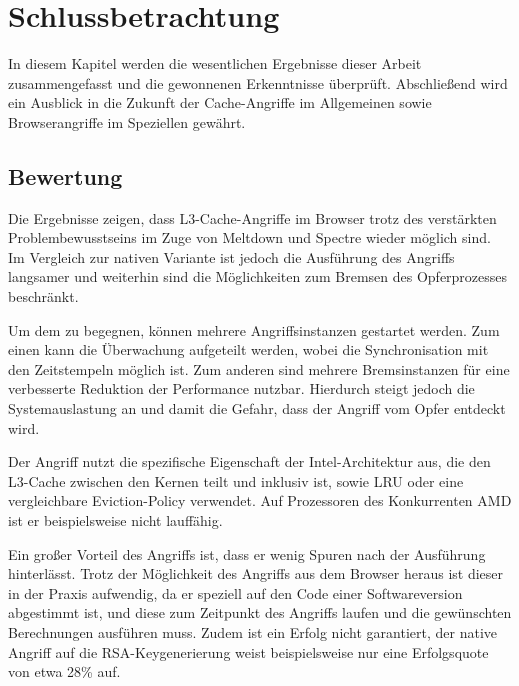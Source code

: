 \chapter{Schlussbetrachtung}
\label{chapter:conclusions}

In diesem Kapitel werden die wesentlichen Ergebnisse dieser Arbeit zusammengefasst und die gewonnenen Erkenntnisse %
überprüft.
Abschließend wird ein Ausblick in die Zukunft der Cache-Angriffe im Allgemeinen sowie Browserangriffe im Speziellen gewährt.

\section{Bewertung}

Die Ergebnisse zeigen, dass L3-Cache-Angriffe im Browser trotz des verstärkten Problembewusstseins im Zuge von Meltdown und Spectre wieder möglich sind.
Im Vergleich zur nativen Variante ist jedoch die Ausführung des Angriffs langsamer und weiterhin sind die Möglichkeiten zum Bremsen des Opferprozesses beschränkt.

Um dem zu begegnen, können mehrere Angriffsinstanzen gestartet werden.
Zum einen kann die Überwachung aufgeteilt werden, wobei die Synchronisation mit den Zeitstempeln möglich ist.
Zum anderen sind mehrere Bremsinstanzen für eine verbesserte Reduktion der Performance nutzbar.
Hierdurch steigt jedoch die Systemauslastung an und damit die Gefahr, dass der Angriff vom Opfer entdeckt wird. 


Der Angriff nutzt die spezifische Eigenschaft der Intel-Architektur aus, die den L3-Cache zwischen den Kernen teilt und inklusiv ist, sowie LRU oder eine vergleichbare Eviction-Policy verwendet.
Auf Prozessoren des Konkurrenten AMD ist er beispielsweise nicht lauffähig.

Ein großer Vorteil des Angriffs ist, dass er wenig Spuren nach der Ausführung hinterlässt.
Trotz der Möglichkeit des Angriffs aus dem Browser heraus ist dieser in der Praxis aufwendig, da er speziell auf den Code einer Softwareversion abgestimmt ist, und diese zum Zeitpunkt des Angriffs laufen und die gewünschten Berechnungen ausführen muss. 
Zudem ist ein Erfolg nicht garantiert, der native Angriff auf die RSA-Keygenerierung \cite{RSAKeyGeneration2} weist beispielsweise nur eine Erfolgsquote von etwa 28\% auf.

